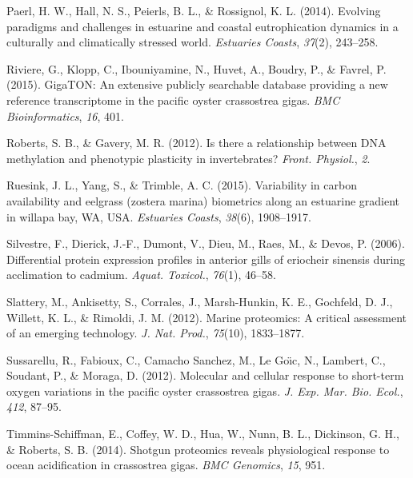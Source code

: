 \documentclass [11pt, proquest] {uwthesis}[2015/03/03]
\newlength{\cslhangindent}
\newenvironment{CSLReferences}%
{\setlength{\parindent}{0pt}%
\everypar{\setlength{\hangindent}{\cslhangindent}}\ignorespaces}%
{\par}
\begin{document}
\begin{CSLReferences}{1}{0}
\leavevmode\hypertarget{ref-Paerl2014}{}%
Paerl, H. W., Hall, N. S., Peierls, B. L., \& Rossignol, K. L. (2014). Evolving paradigms and challenges in estuarine and coastal eutrophication dynamics in a culturally and climatically stressed world. \emph{Estuaries Coasts}, \emph{37}(2), 243--258.

\leavevmode\hypertarget{ref-Riviere2015}{}%
Riviere, G., Klopp, C., Ibouniyamine, N., Huvet, A., Boudry, P., \& Favrel, P. (2015). {GigaTON}: An extensive publicly searchable database providing a new reference transcriptome in the pacific oyster crassostrea gigas. \emph{BMC Bioinformatics}, \emph{16}, 401.

\leavevmode\hypertarget{ref-Roberts2012}{}%
Roberts, S. B., \& Gavery, M. R. (2012). Is there a relationship between {DNA} methylation and phenotypic plasticity in invertebrates? \emph{Front. Physiol.}, \emph{2}.

\leavevmode\hypertarget{ref-Ruesink2015}{}%
Ruesink, J. L., Yang, S., \& Trimble, A. C. (2015). Variability in carbon availability and eelgrass (zostera marina) biometrics along an estuarine gradient in willapa bay, {WA}, {USA}. \emph{Estuaries Coasts}, \emph{38}(6), 1908--1917.

\leavevmode\hypertarget{ref-Silvestre2006}{}%
Silvestre, F., Dierick, J.-F., Dumont, V., Dieu, M., Raes, M., \& Devos, P. (2006). Differential protein expression profiles in anterior gills of eriocheir sinensis during acclimation to cadmium. \emph{Aquat. Toxicol.}, \emph{76}(1), 46--58.

\leavevmode\hypertarget{ref-Slattery2012}{}%
Slattery, M., Ankisetty, S., Corrales, J., Marsh-Hunkin, K. E., Gochfeld, D. J., Willett, K. L., \& Rimoldi, J. M. (2012). Marine proteomics: A critical assessment of an emerging technology. \emph{J. Nat. Prod.}, \emph{75}(10), 1833--1877.

\leavevmode\hypertarget{ref-Sussarellu2012}{}%
Sussarellu, R., Fabioux, C., Camacho Sanchez, M., Le Goı̈c, N., Lambert, C., Soudant, P., \& Moraga, D. (2012). Molecular and cellular response to short-term oxygen variations in the pacific oyster crassostrea gigas. \emph{J. Exp. Mar. Bio. Ecol.}, \emph{412}, 87--95.

\leavevmode\hypertarget{ref-Timmins-Schiffman2014}{}%
Timmins-Schiffman, E., Coffey, W. D., Hua, W., Nunn, B. L., Dickinson, G. H., \& Roberts, S. B. (2014). Shotgun proteomics reveals physiological response to ocean acidification in crassostrea gigas. \emph{BMC Genomics}, \emph{15}, 951.


\end{CSLReferences}
\end{document}
